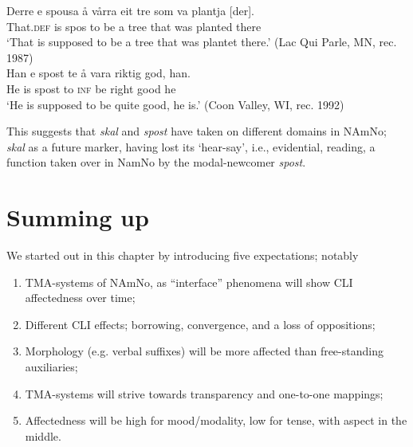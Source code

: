 \documentclass[output=paper]{langscibook}
\begin{document}
\ea%
    \label{ex:eide:34}
    \ea \label{ex:eide:34a} 
    \gll Derre e spousa å vårra eit tre som va plantja [der].  \\
         That.\textsc{def} is spos to be a tree that was planted there   \\
    \glt ‘That is supposed to be a tree that was plantet there.’ (Lac Qui Parle, MN, rec. 1987)\\
    \ex \label{ex:eide:34b} 
    \gll  Han e spost te å vara riktig god, han.    \\
          He is spost to \textsc{inf} be right good he      \\
    \glt ‘He is supposed to be quite good, he is.’ (Coon Valley, WI, rec. 1992)
    \z %
\z

This suggests that \textit{skal} and \textit{spost} have taken on different domains in NAmNo; \textit{skal} as a future marker, having lost its ‘hear-say’, i.e., evidential, reading, a function taken over in NamNo by the modal-newcomer \textit{spost}.  

\section{Summing up}
\label{sec:eide:6}

We started out in this chapter by introducing five expectations; notably 

\begin{enumerate}
\item TMA-systems of NAmNo, as “interface” phenomena will show CLI affectedness over time; 
\item Different CLI effects; borrowing, convergence, and a loss of oppositions; 
\item Morphology (e.g. verbal suffixes) will be more affected than free-standing auxiliaries; 
\item TMA-systems will strive towards transparency and one-to-one mappings; 
\item Affectedness will be high for mood/modality, low for tense, with aspect in the middle.
\end{enumerate}
\end{document}
